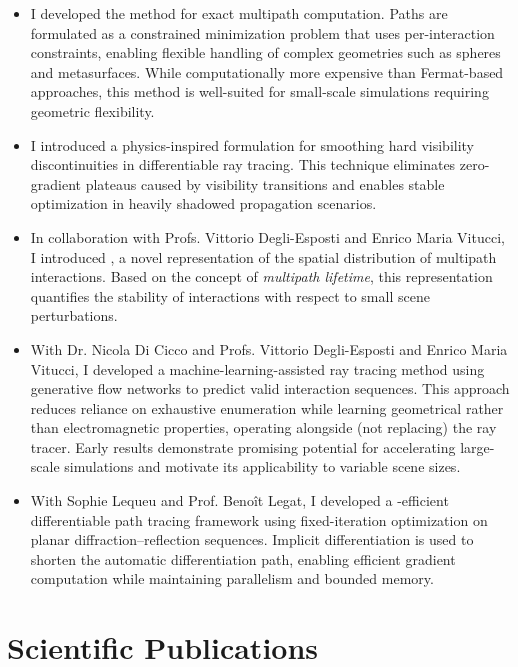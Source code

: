 \begin{itemize}
  \item I developed the \emph{} method for exact multipath computation. Paths are formulated as a constrained minimization problem that uses per-interaction constraints, enabling flexible handling of complex geometries such as spheres and metasurfaces. While computationally more expensive than Fermat-based approaches, this method is well-suited for small-scale simulations requiring geometric flexibility.

  \item I introduced a physics-inspired formulation for smoothing hard visibility discontinuities in differentiable ray tracing. This technique eliminates zero-gradient plateaus caused by visibility transitions and enables stable optimization in heavily shadowed propagation scenarios.

  \item In collaboration with Profs. Vittorio Degli-Esposti and Enrico Maria Vitucci, I introduced , a novel representation of the spatial distribution of multipath interactions. Based on the concept of \emph{multipath lifetime}, this representation quantifies the stability of interactions with respect to small scene perturbations.

  \item With Dr. Nicola Di Cicco and Profs. Vittorio Degli-Esposti and Enrico Maria Vitucci, I developed a machine-learning-assisted ray tracing method using generative flow networks to predict valid interaction sequences. This approach reduces reliance on exhaustive enumeration while learning geometrical rather than electromagnetic properties, operating alongside (not replacing) the ray tracer. Early results demonstrate promising potential for accelerating large-scale simulations and motivate its applicability to variable scene sizes.

  \item With Sophie Lequeu and Prof. Benoît Legat, I developed a -efficient differentiable path tracing framework using fixed-iteration optimization on planar diffraction--reflection sequences. Implicit differentiation is used to shorten the automatic differentiation path, enabling efficient gradient computation while maintaining parallelism and bounded memory.

\end{itemize}

\section{Scientific Publications}

